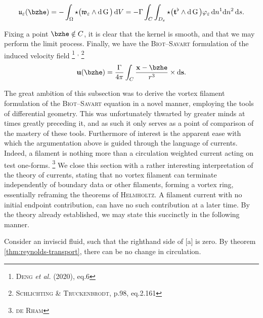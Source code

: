\begin{equation}
  \ufrak_{\varepsilon}(\bzhe) = -\int_{\Omega} \star \big( \vorticityfrak_{\varepsilon} \wedge \dee \green \big) \,\dee V = -\Gamma \int_{C} \int_{D_{\varepsilon}} \star \big( \tvec^{\flat} \wedge \dee \green \big) \varphi_{\varepsilon} \,\dee n^1 \dee n^2 \,\dee s.
\end{equation}

\noindent
Fixing a point $\bzhe \notin C$, it is clear that the kernel is smooth, and that we may perform the limit process.
Finally, we have the \textsc{Biot}--\textsc{Savart} formulation of the induced velocity field%
\footnote{%
        \cite{deng2020acceleration} \textsc{Deng} \emph{et al.} (2020), eq.6
}%
\textsuperscript{,}%
\footnote{%
        \cite{schlichting1967aerodynamiki} \textsc{Schlichting} \& \textsc{Truckenbrodt}, p.98, eq.2.161
}
\begin{equation}\label{eq:Biot-Savart}
  \uvec(\bzhe) = \frac{\Gamma}{4\pi} \int_{C} \frac{\xvec - \bzhe}{r^3} \times \dee\svec.
\end{equation}

\noindent
The great ambition of this subsection was to derive the vortex filament formulation of the \textsc{Biot}--\textsc{Savart} equation in a novel manner, employing the tools of differential geometry.
This was unfortunately thwarted by greater minds at times greatly preceding it, and as such it only serves as a point of comparison of the mastery of these tools.
Furthermore of interest is the apparent ease with which the argumentation above is guided through the language of currents.
Indeed, a filament is nothing more than a circulation weighted current acting on test one-forms.%
\footnote{%
  \cite{rham1984differentiable} \textsc{de Rham} 
}
We close this section with a rather interesting interpretation of the theory of currents, stating that no vortex filament can terminate independently of boundary data or other filaments, forming a vortex ring, essentially reframing the theorems of \textsc{Helmholtz}.
A filament current with no initial endpoint contribution, can have no such contribution at a later time.
By the theory already established, we may state this succinctly in the following manner.

\begin{theorem}\label{thm:circulation-theorem}
  Consider an inviscid fluid, such that the righthand side of \subeqref{\ref{eq:vorticity-equation}}[a] is zero.
  By theorem \ref{thm:reynolds-transport}, there can be no change in circulation.
\end{theorem}
